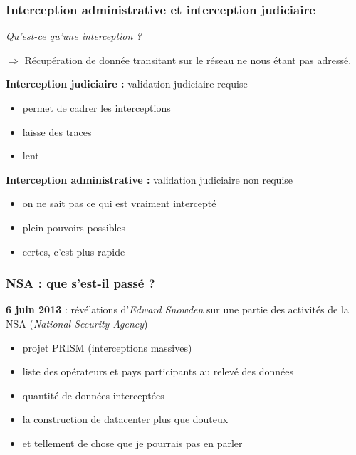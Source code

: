 \begin{frame}\frametitle{Interception administrative et interception judiciaire}
    \emph{Qu'est-ce qu'une interception ?}

    $\Rightarrow$ Récupération de donnée transitant sur le réseau ne nous étant
    pas adressé.

    \vspace{1em}

    \textbf{Interception judiciaire :} validation judiciaire requise
    \begin{itemize}
        \item permet de cadrer les interceptions
        \item laisse des traces
        \item lent
    \end{itemize}

    \textbf{Interception administrative :} validation judiciaire non requise
    \begin{itemize}
        \item on ne sait pas ce qui est vraiment intercepté
        \item plein pouvoirs possibles
        \item certes, c'est plus rapide
    \end{itemize}
\end{frame}


\begin{frame}\frametitle{NSA : que s'est-il passé ?}
    \textbf{6 juin 2013} : révélations d'\emph{Edward Snowden} sur une partie des
    activités de la \textsc{NSA} (\emph{National Security Agency})

    \begin{itemize}
        \item projet PRISM (interceptions massives)
        \item liste des opérateurs et pays participants au relevé des données
        \item quantité de données interceptées
        \item la construction de datacenter plus que douteux
        \item et tellement de chose que je pourrais pas en parler
    \end{itemize}
\end{frame}


